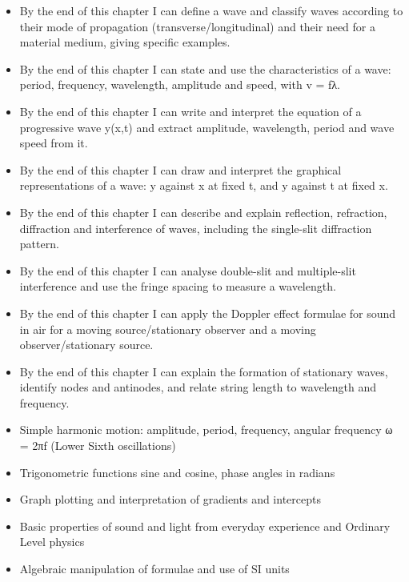 \documentclass[11pt]{article}
\begin{document}
\begin{objectifs}
\begin{itemize}
\item By the end of this chapter I can define a wave and classify waves according to their mode of propagation (transverse/longitudinal) and their need for a material medium, giving specific examples.
\item By the end of this chapter I can state and use the characteristics of a wave: period, frequency, wavelength, amplitude and speed, with v = fλ.
\item By the end of this chapter I can write and interpret the equation of a progressive wave y(x,t) and extract amplitude, wavelength, period and wave speed from it.
\item By the end of this chapter I can draw and interpret the graphical representations of a wave: y against x at fixed t, and y against t at fixed x.
\item By the end of this chapter I can describe and explain reflection, refraction, diffraction and interference of waves, including the single-slit diffraction pattern.
\item By the end of this chapter I can analyse double-slit and multiple-slit interference and use the fringe spacing to measure a wavelength.
\item By the end of this chapter I can apply the Doppler effect formulae for sound in air for a moving source/stationary observer and a moving observer/stationary source.
\item By the end of this chapter I can explain the formation of stationary waves, identify nodes and antinodes, and relate string length to wavelength and frequency.
\end{itemize}
\end{objectifs}

\begin{prerequis}
\begin{itemize}
\item Simple harmonic motion: amplitude, period, frequency, angular frequency ω = 2πf (Lower Sixth oscillations)
\item Trigonometric functions sine and cosine, phase angles in radians
\item Graph plotting and interpretation of gradients and intercepts
\item Basic properties of sound and light from everyday experience and Ordinary Level physics
\item Algebraic manipulation of formulae and use of SI units
\end{itemize}
\end{prerequis}
\end{document}
